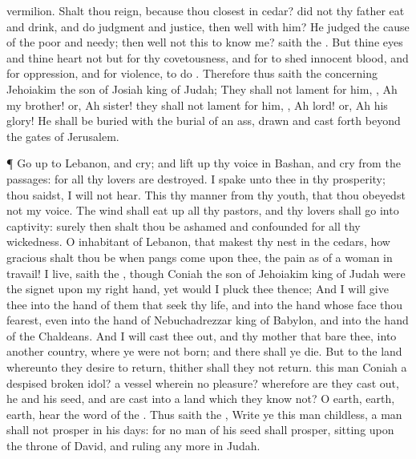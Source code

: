 {vermilion.
Shalt thou
reign, because thou
closest
{} in
cedar? did not thy
father
eat and
drink, and
do
judgment and
justice,
{} then
{}
well with him?
He
judged the
cause of the
poor and
needy; then
{}
well
{} not this to
know me?
saith the
{}.
But thine
eyes and thine
heart
{} not but for thy
covetousness, and for to
shed
innocent
blood, and for
oppression, and for
violence, to
do
{}.
Therefore thus
saith the
{} concerning
Jehoiakim the
son of
Josiah
king of
Judah; They shall not
lament for him,
{},
Ah my
brother! or,
Ah
sister! they shall not
lament for him,
{},
Ah
lord! or,
Ah his
glory!
He shall be
buried with the
burial of an
ass,
drawn and cast
forth
beyond the
gates of
Jerusalem.
\par }{\PP {}¶ Go
up to
Lebanon, and
cry; and lift
up thy
voice in
Bashan, and
cry from the
passages: for all thy
lovers are
destroyed.
I
spake unto thee in thy
prosperity;
{} thou
saidst, I will not
hear. This
{} thy
manner from thy
youth, that thou
obeyedst not my
voice.
The
wind shall eat
up all thy
pastors, and thy
lovers shall
go into
captivity: surely then shalt thou be
ashamed and
confounded for all thy
wickedness.
O
inhabitant of
Lebanon, that makest thy
nest in the
cedars, how
gracious shalt thou be when
pangs
come upon thee, the
pain as of a woman in
travail!
 I
live,
saith the
{}, though
Coniah the
son of
Jehoiakim
king of
Judah were the
signet upon my
right
hand, yet would I
pluck thee thence;
And I will
give thee into the
hand of them that
seek thy
life, and into the
hand
{} whose
face thou
fearest, even into the
hand of
Nebuchadrezzar
king of
Babylon, and into the
hand of the
Chaldeans.
And I will cast thee
out, and thy
mother that
bare thee, into
another
country, where ye were not
born; and there shall ye
die.
But to the
land whereunto they
desire to
return, thither shall they not
return.
 this
man
Coniah a
despised
broken
idol?
{} a
vessel wherein
{} no
pleasure? wherefore are they cast
out, he and his
seed, and are
cast into a
land which they
know not?
O
earth,
earth,
earth,
hear the
word of the
{}.
Thus
saith the
{},
Write ye this
man
childless, a
man
{} shall not
prosper in his
days: for no
man of his
seed shall
prosper,
sitting upon the
throne of
David, and
ruling any more in
Judah.

}

